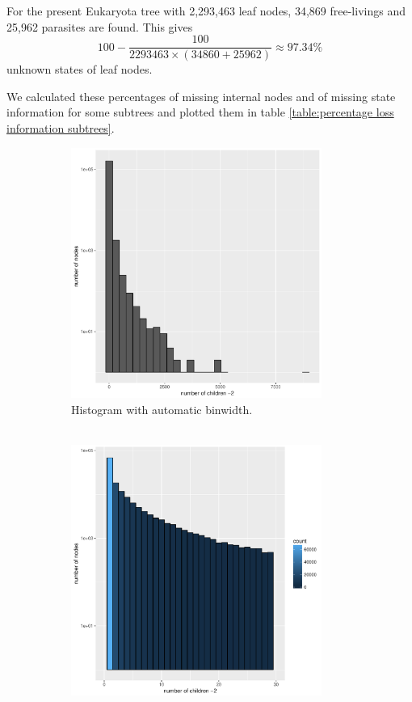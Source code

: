     For the present Eukaryota tree with 2,293,463 leaf nodes, 34,869 free-livings and 25,962 parasites 
      are found. This gives
      $$100-\frac{100}{2293463 \times (34860+25962)} \approx 97.34\%$$
      unknown states of leaf nodes.

    We calculated these percentages of missing internal nodes and of missing state information for 
      some subtrees and plotted them in table \ref{table:percentage loss information subtrees}.

    \begin{figure}[h!]
      \centering
      \begin{subfigure}[b]{0.59\textwidth}
        \includegraphics[width=0.9\textwidth]{Figures/multifurc.pdf}
        \caption{Histogram with automatic binwidth. \\ ~}
      \end{subfigure}
      \begin{subfigure}[b]{0.4\textwidth}
        \includegraphics[trim = 0mm 0mm 30mm 0mm, clip, width=0.9\textwidth]{Figures/multifurc_small.pdf}

\end{subfigure}
\end{figure}
